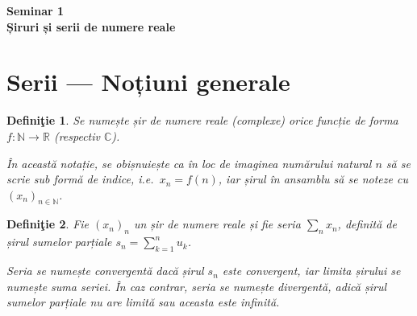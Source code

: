 \documentclass[11pt,a4paper]{article}
\newcommand\ds{\displaystyle}
\newcommand\NN{\mathbb{N}}
\theoremstyle{dotless}
\theoremstyle{dotlessdr}
\newtheorem{definition}{Defini\c{t}ie}[section]
\begin{document}

\begin{center}
  {\large\textbf{Seminar 1 \\ Șiruri și serii de numere reale}}
\end{center}

\section{Serii --- Noțiuni generale}

\begin{definition}\label{def:sir}
  Se numește \emph{șir de numere reale (complexe)} orice funcție de forma
  $f : \mathbb{N} \to \mathbb{R}$ (respectiv $\mathbb{C}$).

  În această notație, se obișnuiește ca în loc de imaginea numărului
  natural $n$ să se scrie sub formă de indice, i.e.\ $x_n = f(n)$, iar
  șirul în ansamblu să se noteze cu $(x_n)_{n \in \NN}$.
\end{definition}

\begin{definition}\label{def:serie}
  Fie $(x_n)_n$ un șir de numere reale și fie seria $\sum_n x_n$, definită
  de șirul sumelor parțiale $s_n = \ds\sum_{k=1}^n u_k$.

  Seria se numește \emph{convergentă} dacă șirul $s_n$ este convergent, iar
  limita șirului se numește \emph{suma seriei}. În caz contrar, seria se numește
  \emph{divergentă}, adică șirul sumelor parțiale nu are limită sau aceasta este
  infinită.
\end{definition}
\end{document}
